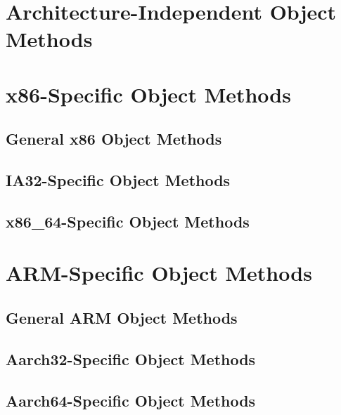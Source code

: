 \section{Architecture-Independent Object Methods}
\label{sec:kobj_api}

\ifxeightsix

\clearpage

\section{x86-Specific Object Methods}

\subsection{General x86 Object Methods}
\clearpage

\subsection{IA32-Specific Object Methods}
\clearpage

\subsection{x86\_64-Specific Object Methods}

\fi %

\clearpage

\section{ARM-Specific Object Methods}

\subsection{General ARM Object Methods}
\clearpage

\subsection{Aarch32-Specific Object Methods}
\clearpage

\subsection{Aarch64-Specific Object Methods}
\clearpage
